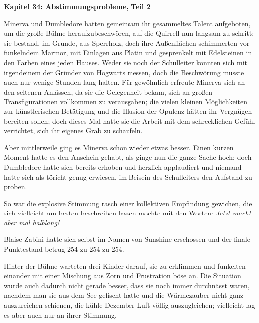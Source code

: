 

\hypertarget{abstimmungsprobleme-teil-2}{%

\textbf{Kapitel 34: Abstimmungsprobleme, Teil 2}

Minerva und Dumbledore hatten gemeinsam ihr gesammeltes Talent aufgeboten, um die große Bühne heraufzubeschwören, auf die Quirrell nun langsam zu schritt; sie bestand, im Grunde, aus Sperrholz, doch ihre Außenflächen schimmerten vor funkelndem Marmor, mit Einlagen aus Platin und gesprenkelt mit Edelsteinen in den Farben eines jeden Hauses. Weder sie noch der Schulleiter konnten sich mit irgendeinem der Gründer von Hogwarts messen, doch die Beschwörung musste auch nur wenige Stunden lang halten. Für gewöhnlich erfreute Minerva sich an den seltenen Anlässen, da sie die Gelegenheit bekam, sich an großen Transfigurationen vollkommen zu verausgaben; die vielen kleinen Möglichkeiten zur künstlerischen Betätigung und die Illusion der Opulenz hätten ihr Vergnügen bereiten sollen; doch dieses Mal hatte sie die Arbeit mit dem schrecklichen Gefühl verrichtet, sich ihr eigenes Grab zu schaufeln.

Aber mittlerweile ging es Minerva schon wieder etwas besser. Einen kurzen Moment hatte es den Anschein gehabt, als ginge nun die ganze Sache hoch; doch Dumbledore hatte sich bereits erhoben und herzlich applaudiert und niemand hatte sich als töricht genug erwiesen, im Beisein des Schulleiters den Aufstand zu proben.

So war die explosive Stimmung rasch einer kollektiven Empfindung gewichen, die sich vielleicht am besten beschreiben lassen mochte mit den Worten: \emph{Jetzt macht aber mal halblang!}

Blaise Zabini hatte sich selbst im Namen von Sunshine erschossen und der finale Punktestand betrug 254 zu 254 zu 254.

\later

Hinter der Bühne warteten drei Kinder darauf, sie zu erklimmen und funkelten einander mit einer Mischung aus Zorn und Frustration böse an. Die Situation wurde auch dadurch nicht gerade besser, dass sie noch immer durchnässt waren, nachdem man sie aus dem See gefischt hatte und die Wärmezauber nicht ganz auszureichen schienen, die kühle Dezember-Luft völlig auszugleichen; vielleicht lag es aber auch nur an ihrer Stimmung.

}

